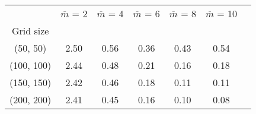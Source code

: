 \begin{tabular}{ccccccc}
\toprule
{} &  $\overline{m}$ = 2 &  $\overline{m}$ = 4 &  $\overline{m}$ = 6 &  $\overline{m}$ = 8 &  $\overline{m}$ = 10 \\
Grid size  &                     &                     &                     &                     &                      \\
\midrule
(50, 50)   &                2.50 &                0.56 &                0.36 &                0.43 &                 0.54 \\
(100, 100) &                2.44 &                0.48 &                0.21 &                0.16 &                 0.18 \\
(150, 150) &                2.42 &                0.46 &                0.18 &                0.11 &                 0.11 \\
(200, 200) &                2.41 &                0.45 &                0.16 &                0.10 &                 0.08 \\
\bottomrule
\end{tabular}
